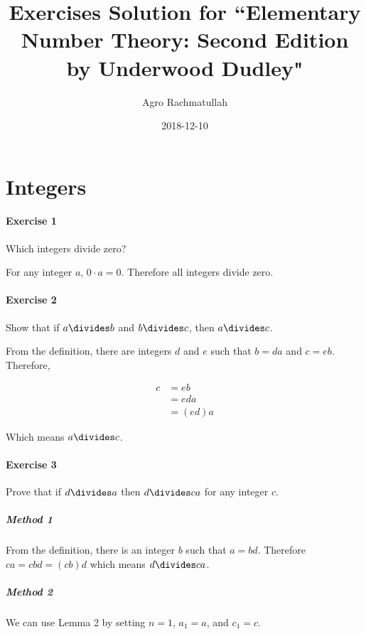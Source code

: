 \documentclass{article}
\title{Exercises Solution for ``Elementary Number Theory: Second Edition by Underwood Dudley"}
\date{2018-12-10}
\author{Agro Rachmatullah}
\begin{document}
  \maketitle
  
  \newpage
  \section{Integers}
  
  \paragraph{Exercise 1} Which integers divide zero?
  
  For any integer $a$, $0 \cdot a = 0$. Therefore all integers divide zero.
  
  \paragraph{Exercise 2} Show that if $a \divides b$ and $b \divides c$, then $a \divides c$.
  
  From the definition, there are integers $d$ and $e$ such that $b = da$ and $c = eb$.
  Therefore,
  
  \begin{align*}
  c &= eb \\
     &= eda \\
     &= (ed)a
  \end{align*}
  
  Which means $a \divides c$.
  
  \paragraph{Exercise 3} Prove that if $d \divides a$ then $d \divides ca$ for any integer $c$.
  
  \subparagraph{Method 1} From the definition, there is an integer $b$ such that $a = bd$. Therefore $ca = cbd = (cb)d$
  which means $d \divides ca$.
  
  \subparagraph{Method 2} We can use Lemma 2 by setting $n = 1$, $a_1 = a$, and $c_1 = c$.
\end{document}
